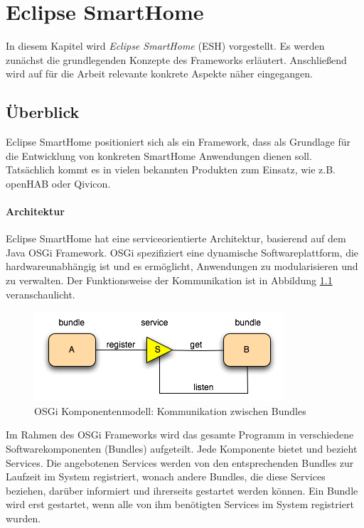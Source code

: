 \chapter{Eclipse SmartHome}
\label{chap:esh}
In diesem Kapitel wird \textit{Eclipse SmartHome} (ESH) \cite{ESH:home} vorgestellt. Es werden zunächst die grundlegenden Konzepte des Frameworks erläutert. Anschließend wird auf für die Arbeit relevante konkrete Aspekte näher eingegangen.

\section{Überblick}
Eclipse SmartHome positioniert sich als ein Framework, dass als Grundlage für die Entwicklung von konkreten SmartHome Anwendungen dienen soll. Tatsächlich kommt es in vielen bekannten Produkten zum Einsatz, wie z.B. openHAB\cite{openHAB} oder Qivicon\cite{qivicon}.


\subsubsection{Architektur}
Eclipse SmartHome hat eine serviceorientierte Architektur, basierend auf dem Java OSGi Framework\cite{osgibook}. OSGi spezifiziert eine dynamische Softwareplattform, die hardwareunabhängig ist und es ermöglicht, Anwendungen zu modularisieren und zu verwalten. Der Funktionsweise der Kommunikation ist in Abbildung \ref{fig:osgi} veranschaulicht.

\begin{figure}[h]
	\centering
	\includegraphics{bilder/osgi}
	\caption{OSGi Komponentenmodell: Kommunikation zwischen Bundles \cite{osgi:whatisit}}
	\label{fig:osgi}
\end{figure}

Im Rahmen des OSGi Frameworks wird das gesamte Programm in verschiedene Softwarekomponenten (Bundles) aufgeteilt. Jede Komponente bietet und bezieht Services. Die angebotenen Services werden von den entsprechenden Bundles zur Laufzeit im System registriert, wonach andere Bundles, die diese Services beziehen, darüber informiert und ihrerseits gestartet werden können. Ein Bundle wird erst gestartet, wenn alle von ihm benötigten Services im System registriert wurden.\\

